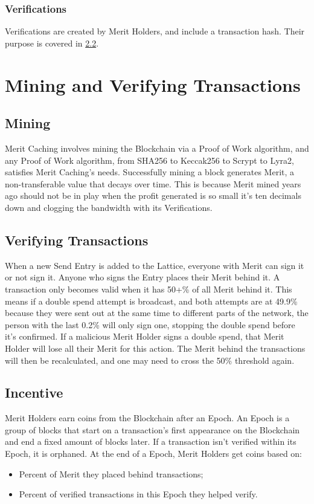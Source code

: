 \documentclass[14pt]{article}
\begin{document}
\label{sec:1.2.2}
\subsubsection{Verifications}
Verifications are created by Merit Holders, and include a transaction hash. Their purpose is covered in \hyperref[sec:2.2]{2.2}.

\newpage

\label{sec:2}
\section{Mining and Verifying Transactions}

\label{sec:2.1}
\subsection{Mining}
Merit Caching involves mining the Blockchain via a Proof of Work algorithm, and any Proof of Work algorithm, from SHA256 to Keccak256 to Scrypt to Lyra2, satisfies Merit Caching's needs. Successfully mining a block generates Merit, a non-transferable value that decays over time. This is because Merit mined years ago should not be in play when the profit generated is so small it's ten decimals down and clogging the bandwidth with its Verifications.

\label{sec:2.2}
\subsection{Verifying Transactions}
When a new Send Entry is added to the Lattice, everyone with Merit can sign it or not sign it. Anyone who signs the Entry places their Merit behind it. A transaction only becomes valid when it has 50+\% of all Merit behind it. This means if a double spend attempt is broadcast, and both attempts are at 49.9\% because they were sent out at the same time to different parts of the network, the person with the last 0.2\% will only sign one, stopping the double spend before it's confirmed. If a malicious Merit Holder signs a double spend, that Merit Holder will lose all their Merit for this action. The Merit behind the transactions will then be recalculated, and one may need to cross the 50\% threshold again.

\newpage

\label{sec:2.3}
\subsection{Incentive}
Merit Holders earn coins from the Blockchain after an Epoch. An Epoch is a group of blocks that start on a transaction’s first appearance on the Blockchain and end a fixed amount of blocks later. If a transaction isn’t verified within its Epoch, it is orphaned. At the end of a Epoch, Merit Holders get coins based on:
\begin{itemize}
\item Percent of Merit they placed behind transactions;
\item Percent of verified transactions in this Epoch they helped verify.
\end{itemize}
\end{document}
